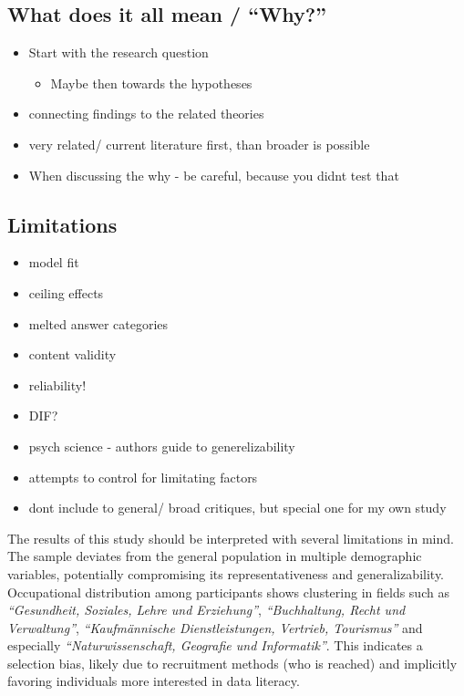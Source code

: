 \documentclass[
  12pt,
  a4paper,
  twoside]{article}
\providecommand{\tightlist}{%
  \setlength{\itemsep}{0pt}\setlength{\parskip}{0pt}}
\begin{document}
\subsection{What does it all mean / ``Why?''}\label{what-does-it-all-mean-why}

\begin{itemize}
\tightlist
\item
  Start with the research question

  \begin{itemize}
  \tightlist
  \item
    Maybe then towards the hypotheses
  \end{itemize}
\item
  connecting findings to the related theories
\item
  very related/ current literature first, than broader is possible
\item
  When discussing the why - be careful, because you didnt test that
\end{itemize}

\subsection{Limitations}\label{limitations}

\begin{itemize}
\tightlist
\item
  model fit
\item
  ceiling effects
\item
  melted answer categories
\item
  content validity
\item
  reliability!
\item
  DIF?
\item
  psych science - authors guide to generelizability
\item
  attempts to control for limitating factors
\item
  dont include to general/ broad critiques, but special one for my own study
\end{itemize}

The results of this study should be interpreted with several limitations in mind. The sample deviates from the general population in multiple demographic variables, potentially compromising its representativeness and generalizability. Occupational distribution among participants shows clustering in fields such as \emph{``Gesundheit, Soziales, Lehre und Erziehung''}, \emph{``Buchhaltung, Recht und Verwaltung''}, \emph{``Kaufmännische Dienstleistungen, Vertrieb, Tourismus''} and especially \emph{``Naturwissenschaft, Geografie und Informatik''}. This indicates a selection bias, likely due to recruitment methods (who is reached) and implicitly favoring individuals more interested in data literacy.
\end{document}

